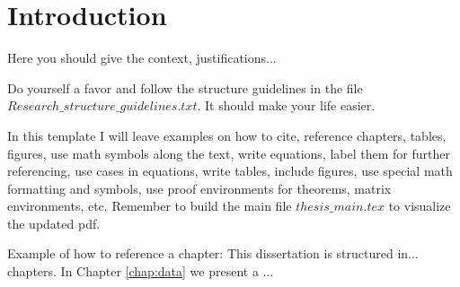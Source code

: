 \chapter{Introduction} \label{chap:intro}

Here you should give the context, justifications...

Do yourself a favor and follow the structure guidelines in the file $Research\_structure\_guidelines.txt$. It should make your life easier.

In this template I will leave examples on how to cite, reference chapters, tables, figures, use math symbols along the text, write equations, label them for further referencing, use cases in equations, write tables, include figures, use special math formatting and symbols, use proof environments for theorems, matrix environments, etc. Remember to build the main file $thesis\_main.tex$ to visualize the updated pdf.

Example of how to reference a chapter: This dissertation is structured in... chapters. In Chapter \ref{chap:data} we present a ...

\cite{ait2001a}
